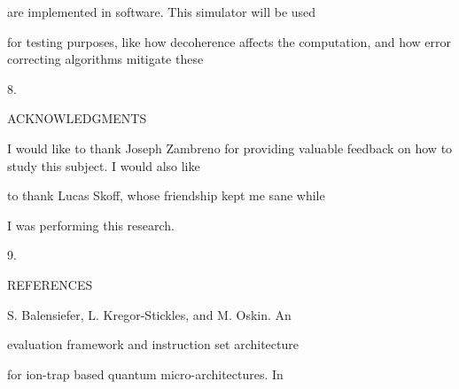 \documentclass[a4paper,portrait,12pt]{article}
\begin{document}
\begin{flushleft}
are implemented in software. This simulator will be used
\end{flushleft}


\begin{flushleft}
for testing purposes, like how decoherence affects the computation, and how error correcting algorithms mitigate these
\end{flushleft}





8.





\begin{flushleft}
ACKNOWLEDGMENTS
\end{flushleft}





\begin{flushleft}
I would like to thank Joseph Zambreno for providing valuable feedback on how to study this subject. I would also like
\end{flushleft}


\begin{flushleft}
to thank Lucas Skoff, whose friendship kept me sane while
\end{flushleft}


\begin{flushleft}
I was performing this research.
\end{flushleft}





9.





\begin{flushleft}
REFERENCES
\end{flushleft}





\begin{flushleft}
[1] S. Balensiefer, L. Kregor-Stickles, and M. Oskin. An
\end{flushleft}


\begin{flushleft}
evaluation framework and instruction set architecture
\end{flushleft}


\begin{flushleft}
for ion-trap based quantum micro-architectures. In
\end{flushleft}
\end{document}
